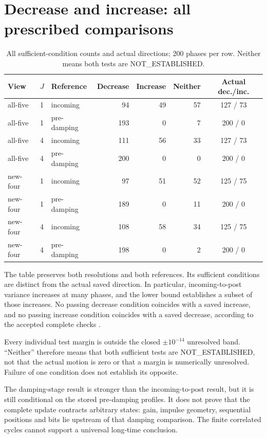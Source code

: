 \documentclass[11pt,a4paper]{article}
\begin{document}
\section{Decrease and increase: all prescribed comparisons}\label{sec:conditions-results}
\begin{table}[h!]
\centering\small\setlength{\tabcolsep}{4pt}
\caption{All sufficient-condition counts and actual directions; 200 phases per row. Neither means both tests are NOT\_ESTABLISHED.}\label{tab:conditions}
\begin{tabular}{ll l r r r c}\toprule
View & $J$ & Reference & Decrease & Increase & Neither & Actual dec./inc.\\\midrule
all-five & 1 & incoming & 94 & 49 & 57 & 127 / 73\\
all-five & 1 & pre-damping & 193 & 0 & 7 & 200 / 0\\
all-five & 4 & incoming & 111 & 56 & 33 & 127 / 73\\
all-five & 4 & pre-damping & 200 & 0 & 0 & 200 / 0\\
new-four & 1 & incoming & 97 & 51 & 52 & 125 / 75\\
new-four & 1 & pre-damping & 189 & 0 & 11 & 200 / 0\\
new-four & 4 & incoming & 108 & 58 & 34 & 125 / 75\\
new-four & 4 & pre-damping & 198 & 0 & 2 & 200 / 0\\
\bottomrule\end{tabular}
\end{table}

The table preserves both resolutions and both references. Its sufficient conditions are distinct from the actual saved direction. In particular, incoming-to-post variance increases at many phases, and the lower bound establishes a subset of those increases. No passing decrease condition coincides with a saved increase, and no passing increase condition coincides with a saved decrease, according to the accepted complete checks \cite{review}.

Every individual test margin is outside the closed $\pm10^{-14}$ unresolved band. ``Neither'' therefore means that both sufficient tests are NOT\_ESTABLISHED, not that the actual motion is zero or that a margin is numerically unresolved. Failure of one condition does not establish its opposite.

The damping-stage result is stronger than the incoming-to-post result, but it is still conditional on the stored pre-damping profiles. It does not prove that the complete update contracts arbitrary states: gain, impulse geometry, sequential positions and bits lie upstream of that damping comparison. The finite correlated cycles cannot support a universal long-time conclusion.
\end{document}
